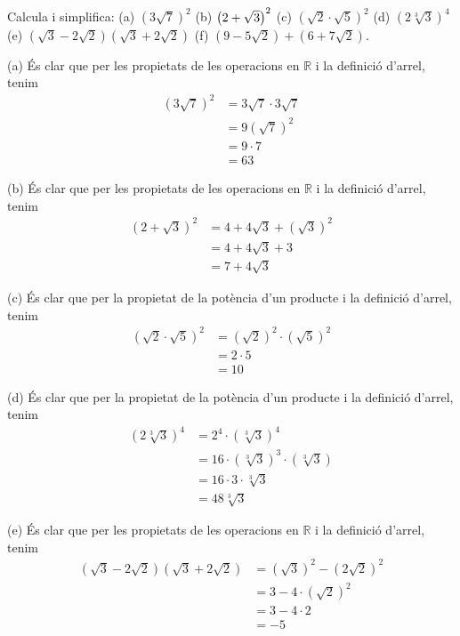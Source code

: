 \begin{exercici}
Calcula i simplifica: (a) $\left( 3\sqrt{7}\right) ^{2}$ (b) $\left( 2+\sqrt{%
3}\right) ^{2}$ (c) $\left( \sqrt{2}\cdot \sqrt{5}\right) ^{2}$ (d) $\left( 2%
\sqrt[3]{3}\right) ^{4}$ (e) $(\sqrt{3}-2\sqrt{2})(\sqrt{3}+2\sqrt{2})$ (f) $%
\left( 9-5\sqrt{2}\right) +\left( 6+7\sqrt{2}\right) $.

\end{exercici}

\begin{solucio}
(a) És clar que per les propietats de les operacions en $\mathbb{R}$ i la
definició d’arrel, tenim%
\begin{align*}
\left( 3\sqrt{7}\right) ^{2} &=3\sqrt{7}\cdot 3\sqrt{7} \\
&=9\left( \sqrt{7}\right) ^{2} \\
&=9\cdot 7 \\
&=63
\end{align*}

(b) És clar que per les propietats de les operacions en $\mathbb{R}$ i la
definició d’arrel, tenim%
\begin{align*}
\left( 2+\sqrt{3}\right) ^{2} &=4+4\sqrt{3}+\left( \sqrt{3}\right) ^{2} \\
&=4+4\sqrt{3}+3 \\
&=7+4\sqrt{3}
\end{align*}

(c) És clar que per la propietat de la potència d’un producte i la definició d’arrel, tenim%
\begin{align*}
\left( \sqrt{2}\cdot \sqrt{5}\right) ^{2} &=\left( \sqrt{2}\right)
^{2}\cdot \left( \sqrt{5}\right) ^{2} \\
&=2\cdot 5 \\
&=10
\end{align*}

(d) És clar que per la propietat de la potència d’un producte i la definició d’arrel, tenim%
\begin{align*}
\left( 2\sqrt[3]{3}\right) ^{4} &=2^{4}\cdot \left( \sqrt[3]{3}\right) ^{4}
\\
&=16\cdot \left( \sqrt[3]{3}\right) ^{3}\cdot \left( \sqrt[3]{3}\right) \\
&=16\cdot 3\cdot \sqrt[3]{3} \\
&=48\sqrt[3]{3}
\end{align*}

(e) És clar que per les propietats de les operacions en $\mathbb{R}$ i la
definició d’arrel, tenim%
\begin{align*}
(\sqrt{3}-2\sqrt{2})(\sqrt{3}+2\sqrt{2}) &=\left( \sqrt{3}\right)
^{2}-\left( 2\sqrt{2}\right) ^{2} \\
&=3-4\cdot \left( \sqrt{2}\right) ^{2} \\
&=3-4\cdot 2 \\
&=-5
\end{align*}


\end{solucio}
